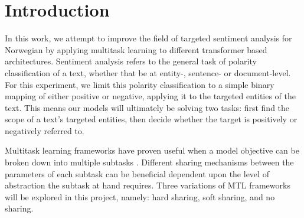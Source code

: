 \documentclass[11pt,a4paper]{article}
\begin{document}


\section{Introduction}
 

In this work, we attempt to improve the field of targeted sentiment analysis for Norwegian by applying multitask learning to different transformer based architectures. 
Sentiment analysis refers to the general task of polarity classification of a text, whether that be at entity-, sentence- or document-level. For this experiment, we limit this polarity classification to a simple binary mapping of either positive or negative, applying it to the targeted entities of the text.  
This means our models will ultimately be solving two tasks: first find the scope of a text's targeted entities, then decide whether the target is positively or negatively referred to. 

Multitask learning frameworks have proven useful when a model objective can be broken down into multiple subtasks \cite{Caruana1993MultitaskLA}. Different sharing mechanisms between the parameters of each subtask can be beneficial dependent upon the level of abstraction the subtask at hand requires. Three variations of MTL frameworks will be explored in this project, namely: hard sharing, soft sharing, and no sharing.
\end{document}
